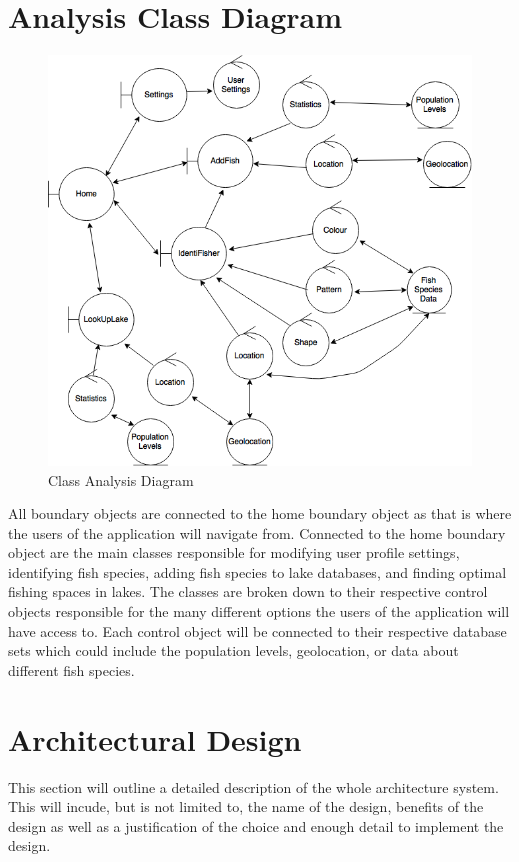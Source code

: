 \documentclass[]{article}
\begin{document}
\section{Analysis Class Diagram}
\label{sec:analysis_class_diagram}
\begin{figure}
\includegraphics[width=\textwidth]{classAnalysis}
\caption{Class Analysis Diagram}
\end{figure}

\FloatBarrier

All boundary objects are connected to the home boundary object as that is where the users of the application will navigate from. Connected to the home boundary object are the main classes responsible for modifying user profile settings, identifying fish species, adding fish species to lake databases, and finding optimal fishing spaces in lakes. The classes are broken down to their respective control objects responsible for the many different options the users of the application will have access to. Each control object will be connected to their respective database sets which could include the population levels, geolocation, or data about different fish species.

\section{Architectural Design}
\label{sec:architectural_design}
This section will outline a detailed description of the whole architecture system. This will incude, but is not limited to, the name of the design, benefits of the design as well as a justification of the choice and enough detail to implement the design.
\end{document}

